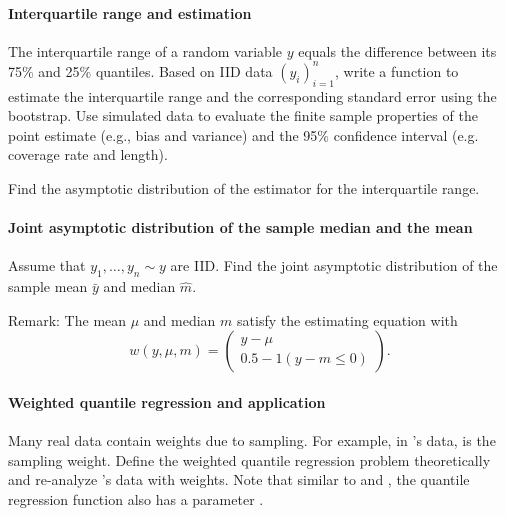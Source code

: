 \paragraph{Interquartile range and estimation}\label{hw22::interquartile-range}

The interquartile range of a random variable $y$ equals the difference between its 75\% and 25\% quantiles. 
Based on IID data $(y_i)_{i=1}^n$, write a function to estimate the interquartile range and the corresponding standard error using the bootstrap. Use simulated data to evaluate the finite sample properties of the point estimate (e.g., bias and variance) and the 95\% confidence interval (e.g. coverage rate and length). 


Find the asymptotic distribution of the estimator for the interquartile range. 

 

\paragraph{Joint asymptotic distribution of the sample median and the mean}
\label{hw22::joint-mean-median}

Assume that $y_1,\ldots, y_n \sim y$ are IID. Find the joint asymptotic distribution of the sample mean $\bar{y}$ and median $\hat{m}$.

Remark: The mean $\mu$ and median $m$ satisfy the estimating equation with 
$$
w(y, \mu, m) = \begin{pmatrix}
y - \mu \\
0.5 - 1(y - m \leq 0)
\end{pmatrix}. 
$$


\paragraph{Weighted quantile regression and application}\label{hw22::weighted-qr-application}

Many real data contain weights due to sampling. For example, in \citet{angrist2006quantile}'s data,  is the sampling weight. Define the weighted quantile regression problem theoretically and re-analyze \citet{angrist2006quantile}'s data with weights. Note that similar to  and , the quantile regression function   also has a parameter . 



 

